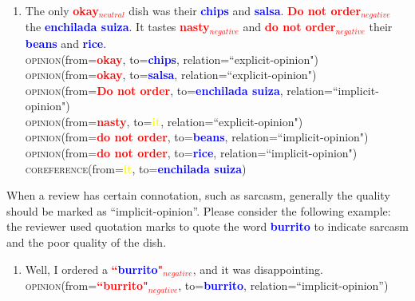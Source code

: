 \documentclass{article}
\begin{document}
\begin{enumerate}[resume]
\item The only \textbf{\textcolor{red}{okay$_{neutral}$}} dish was their \textbf{\textcolor{blue}{chips}} and \textbf{\textcolor{blue}{salsa}}. \textbf{\textcolor{red}{Do not order$_{negative}$}} the \textbf{\textcolor{blue}{enchilada suiza}}. It tastes \textbf{\textcolor{red}{nasty$_{negative}$}} and \textbf{\textcolor{red}{do not order$_{negative}$}} their \textbf{\textcolor{blue}{beans}} and \textbf{\textcolor{blue}{rice}}. \\
\textsc{opinion}(from=\textbf{\textcolor{red}{okay}}, to=\textbf{\textcolor{blue}{chips}}, relation=``explicit-opinion")\\
\textsc{opinion}(from=\textbf{\textcolor{red}{okay}}, to=\textbf{\textcolor{blue}{salsa}}, relation=``explicit-opinion")\\
\textsc{opinion}(from=\textbf{\textcolor{red}{Do not order}}, to=\textbf{\textcolor{blue}{enchilada suiza}}, relation=``implicit-opinion")\\
\textsc{opinion}(from=\textbf{\textcolor{red}{nasty}}, to=\textbf{\textcolor{yellow}{it}}, relation=``explicit-opinion")\\
\textsc{opinion}(from=\textbf{\textcolor{red}{do not order}}, to=\textbf{\textcolor{blue}{beans}}, relation=``implicit-opinion")\\
\textsc{opinion}(from=\textbf{\textcolor{red}{do not order}}, to=\textbf{\textcolor{blue}{rice}}, relation=``implicit-opinion")\\
\textsc{coreference}(from=\textbf{\textcolor{yellow}{it}}, to=\textbf{\textcolor{blue}{enchilada suiza}})
\end{enumerate}

When a review has certain connotation, such as sarcasm, generally the quality should be marked as ``implicit-opinion''. Please consider the following example: the reviewer used quotation marks to quote the word \textbf{\textcolor{blue}{burrito}} to indicate sarcasm and the poor quality of the dish.
\begin{enumerate}[resume]
\item Well, I ordered a  \textbf{\textcolor{red}{``}}\textbf{\textcolor{blue}{burrito}}\textbf{\textcolor{red}{"$_{negative}$}}, and it was disappointing.\\
	\textsc{opinion}(from=\textbf{\textcolor{red}{``burrito"$_{negative}$}}, to=\textbf{\textcolor{blue}{burrito}}, relation=``implicit-opinion'')
\end{enumerate}
\end{document}

